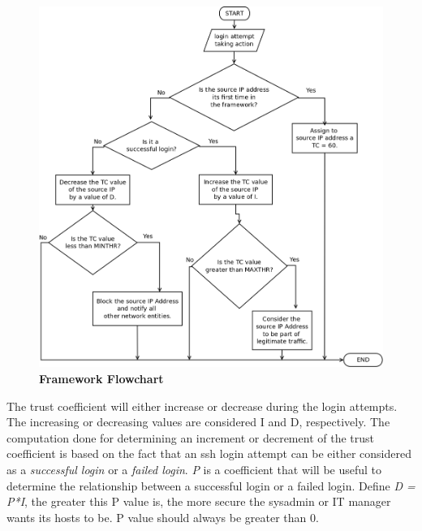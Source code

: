 \documentclass[conference]{IEEEtran}
\begin{document}
\begin{figure}[h!]
\caption{\textbf{Framework Flowchart}}
\label{frmflowchart}
\centering
\includegraphics[scale=0.12]{framework-flowchart} 
\end{figure}
The trust coefficient will either increase or decrease during the login attempts. The increasing or decreasing values are considered I and D, respectively. The computation done for determining an increment or decrement of the trust coefficient is based on the fact that an ssh login attempt can be either considered as a \emph{successful login} or a \emph{failed login}. \emph{P} is a coefficient that will be useful to determine the relationship between a successful login or a failed login. Define \emph{D = P*I}, the greater this P value is, the more secure the sysadmin or IT manager wants its hosts to be. P value should always be greater than 0.
\end{document}
